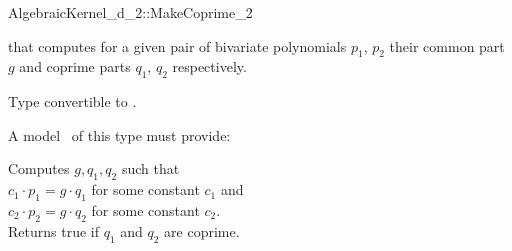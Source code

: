 \begin{ccRefConcept}{AlgebraicKernel_d_2::MakeCoprime_2}

\ccDefinition

 that computes for a given pair of 
bivariate polynomials $p_1$, $p_2$ their common part $g$ and 
coprime parts $q_1$, $q_2$ respectively.


        { Type convertible to .}


A model \ccVar\ of this type must provide:

{ Computes $g, q_1, q_2$ such that\\
$c_1 \cdot p_1 =  g \cdot q_1$ for some constant $c_1$ and\\
$c_2 \cdot p_2 =  g \cdot q_2$ for some constant $c_2$.\\
Returns true if $q_1$ and $q_2$ are coprime. 
}

\ccSeeAlso

\end{ccRefConcept}
